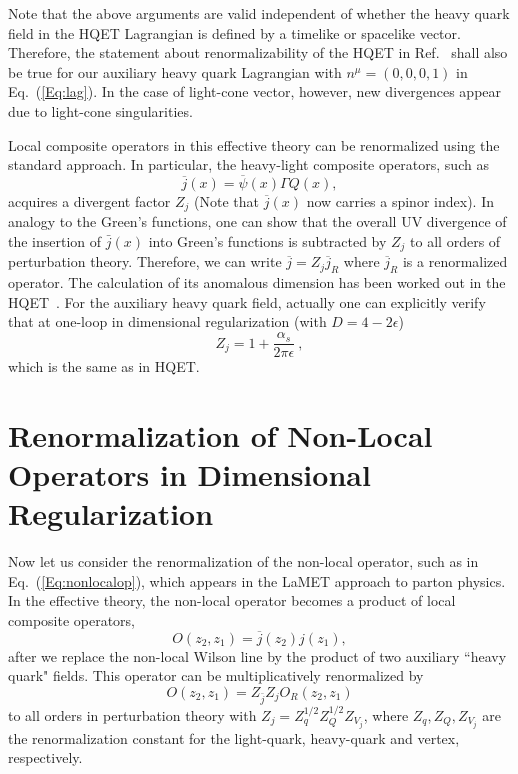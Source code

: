 \documentclass[prd,aps,twocolumn,preprintnumbers, showpacs, nofootinbib,superscriptaddress,notitlepage]{revtex4-1}
\begin{document}
Note that the above arguments are valid independent of whether the heavy quark field in the HQET Lagrangian is defined by a timelike or spacelike vector.
Therefore, the statement about renormalizability of the HQET in Ref.~\cite{Bagan:1993zv} shall also be
true for our auxiliary heavy quark Lagrangian with $n^\mu=(0,0,0,1)$ in Eq.~(\ref{Eq:lag}). In the case of light-cone vector, however,
new divergences appear due to light-cone singularities.

Local composite operators in this effective theory can be renormalized using the standard approach. In particular, the heavy-light composite operators, such as
\begin{equation}
             \overline{j}(x) = \overline{\psi}(x)\Gamma Q(x),
\end{equation}
acquires a divergent factor $Z_j$ (Note that $\overline{j}(x)$
now carries a spinor index). In analogy to the Green's functions, one can show that the overall UV divergence of the insertion of $\bar{j}(x)$ into Green's functions is subtracted by $Z_j$ to all orders of perturbation theory. Therefore, we can write $\overline{j}= Z_j \overline{j}_R$ where $\overline{j}_R$
is a renormalized operator.
 The calculation of its anomalous dimension
has been worked out in the HQET~\cite{Politzer:1988wp,Ji:1991pr}. 
For the auxiliary heavy quark field, actually one can explicitly verify that at one-loop in dimensional regularization (with $D=4-2\epsilon$)
\begin{equation}\label{eq:hl}
   Z_j = 1+ \frac{\alpha_s}{2\pi\epsilon} \ ,
\end{equation}
which is the same as in HQET.

\section{Renormalization of Non-Local Operators in Dimensional Regularization}

Now let us consider the renormalization of the non-local operator, such as in Eq.~(\ref{Eq:nonlocalop}), which appears
in the LaMET approach to parton physics. In the effective theory, the non-local operator
becomes a product of local composite operators,
\begin{equation}
 O(z_2, z_1) = \overline{j}(z_2) j(z_1),
\end{equation}
after we replace the non-local Wilson line by the product of two auxiliary ``heavy quark" fields.
 This operator can be multiplicatively renormalized by
 \begin{equation}
        O(z_2,z_1)= Z_{\bar j}Z_{j} O_R(z_2,z_1)
\end{equation}
to all orders in perturbation theory with $Z_{j}=Z_q^{1/2} Z_Q^{1/2} Z_{V_j}$, where $Z_q, Z_Q, Z_{V_j}$ are the renormalization constant for the light-quark, heavy-quark and vertex, respectively.
\end{document}
